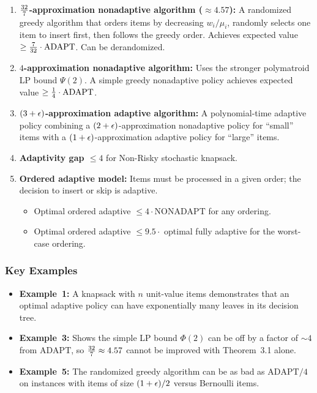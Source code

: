 \begin{enumerate}
    \item \textbf{$\frac{32}{7}$-approximation nonadaptive algorithm ($\approx 4.57$):}
    A randomized greedy algorithm that orders items by decreasing $w_i/\mu_i$, randomly selects one item to insert first, then follows the greedy order. Achieves expected value $\ge \frac{7}{32} \cdot \mathrm{ADAPT}$. Can be derandomized.

    \item \textbf{$4$-approximation nonadaptive algorithm:}
    Uses the stronger polymatroid LP bound $\Psi(2)$. A simple greedy nonadaptive policy achieves expected value $\ge \frac{1}{4} \cdot \mathrm{ADAPT}$.

    \item \textbf{$(3+\epsilon)$-approximation adaptive algorithm:}
    A polynomial-time adaptive policy combining a $(2+\epsilon)$-approximation nonadaptive policy for ``small'' items with a $(1+\epsilon)$-approximation adaptive policy for ``large'' items.

    \item \textbf{Adaptivity gap $\le 4$} for Non-Risky stochastic knapsack.

    \item \textbf{Ordered adaptive model:} Items must be processed in a given order; the decision to insert or skip is adaptive.
    \begin{itemize}
        \item Optimal ordered adaptive $\le 4 \cdot \mathrm{NONADAPT}$ for any ordering.
        \item Optimal ordered adaptive $\le 9.5 \cdot$ optimal fully adaptive for the worst-case ordering.
    \end{itemize}
\end{enumerate}

\subsubsection{Key Examples}

\begin{itemize}
    \item \textbf{Example~1:} A knapsack with $n$ unit-value items demonstrates that an optimal adaptive policy can have exponentially many leaves in its decision tree.
    \item \textbf{Example~3:} Shows the simple LP bound $\Phi(2)$ can be off by a factor of $\sim 4$ from $\mathrm{ADAPT}$, so $\frac{32}{7} \approx 4.57$ cannot be improved with Theorem~3.1 alone.
    \item \textbf{Example~5:} The randomized greedy algorithm can be as bad as $\mathrm{ADAPT}/4$ on instances with items of size $(1+\epsilon)/2$ versus Bernoulli items.
\end{itemize}

